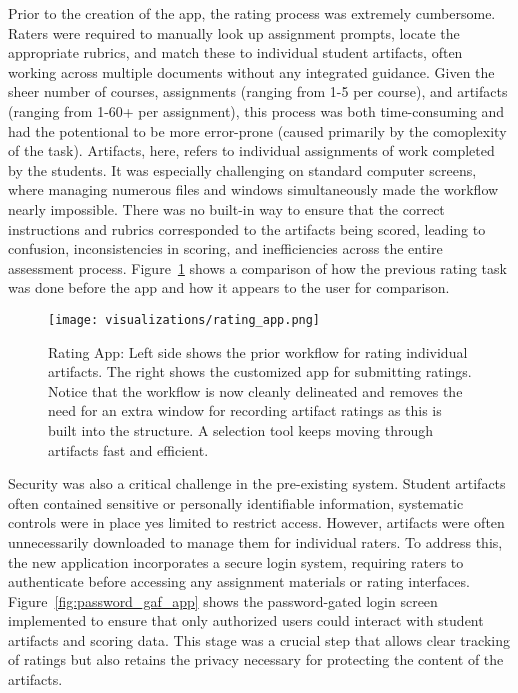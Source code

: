 \documentclass[12pt]{article}%
\begin{document}
Prior to the creation of the app, the rating process was extremely cumbersome. Raters were required to manually look up assignment prompts, locate the appropriate rubrics, and match these to individual student artifacts, often working across multiple documents without any integrated guidance. Given the sheer number of courses, assignments (ranging from 1-5 per course), and artifacts (ranging from 1-60+ per assignment), this process was both time-consuming and had the potentional to be more error-prone (caused primarily by the comoplexity of the task). Artifacts, here, refers to individual assignments of work completed by the students. It was especially challenging on standard computer screens, where managing numerous files and windows simultaneously made the workflow nearly impossible. There was no built-in way to ensure that the correct instructions and rubrics corresponded to the artifacts being scored, leading to confusion, inconsistencies in scoring, and inefficiencies across the entire assessment process. Figure~\ref{fig:rating_app} shows a comparison of how the previous rating task was done before the app and how it appears to the user for comparison. 

\begin{figure}[!h]
    \centering
    \texttt{[image: visualizations/rating\_app.png]}
    \caption{Rating App: Left side shows the prior workflow for rating individual artifacts. The right shows the customized app for submitting ratings. Notice that the workflow is now cleanly delineated and removes the need for an extra window for recording artifact ratings as this is built into the structure. A selection tool keeps moving through artifacts fast and efficient.}
    \label{fig:rating_app}
\end{figure}

Security was also a critical challenge in the pre-existing system. Student artifacts often contained sensitive or personally identifiable information, systematic controls were in place yes limited to restrict access. However, artifacts were often unnecessarily downloaded to manage them for individual raters. To address this, the new application incorporates a secure login system, requiring raters to authenticate before accessing any assignment materials or rating interfaces. Figure~\ref{fig:password_gaf_app} shows the password-gated login screen implemented to ensure that only authorized users could interact with student artifacts and scoring data. This stage was a crucial step that allows clear tracking of ratings but also retains the privacy necessary for protecting the content of the artifacts.
\end{document}
